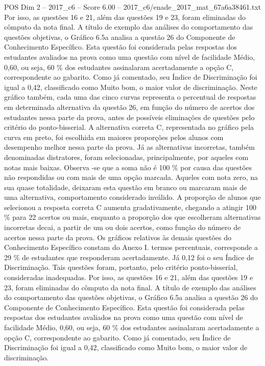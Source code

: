 \begin{textsample}{POS Dim 2 – 2017\_c6 – Score 6.00 – 2017\_c6/enade\_2017\_mat\_67a6a38461.txt}
Por isso, as questões 16 e 21, além das questões 19 e 23, foram eliminadas do cômputo da nota final.
A título de exemplo das análises do comportamento das questões objetivas, o Gráfico 6.5a analisa a questão 26 do Componente de Conhecimento Específico.
Esta questão foi considerada pelas respostas dos estudantes avaliados na prova como uma questão com nível de facilidade Médio, 0,60, ou seja, 60 \% dos estudantes assinalaram acertadamente a opção C, correspondente ao gabarito.
Como já comentado, seu Índice de Discriminação foi igual a 0,42, classificado como Muito bom, o maior valor de discriminação.
Neste gráfico também, cada uma das cinco curvas representa o percentual de respostas em determinada alternativa da questão 26, em função do número de acertos dos estudantes nessa parte da prova, antes de possíveis eliminações de questões pelo critério do ponto-bisserial.
A alternativa correta C, representada no gráfico pela curva em preto, foi escolhida em maiores proporções pelos alunos com desempenho melhor nessa parte da prova.
Já as alternativas incorretas, também denominadas distratores, foram selecionadas, principalmente, por aqueles com notas mais baixas.
Observa -se que a soma não é 100 \% por causa das questões não respondidas ou com mais de uma opção marcada.
Aqueles com nota zero, na sua quase totalidade, deixaram esta questão em branco ou marcaram mais de uma alternativa, comportamento considerado inválido.
A proporção de alunos que selecionou a resposta correta C aumenta gradativamente, chegando a atingir 100 \% para 22 acertos ou mais, enquanto a proporção dos que escolheram alternativas incorretas decai, a partir de um ou dois acertos, como função do número de acertos nessa parte da prova.
Os gráficos relativos às demais questões do Conhecimento Específico constam do Anexo I. termos percentuais, corresponde a 29 \% de estudantes que responderam acertadamente.
Já 0,12 foi o seu Índice de Discriminação.
Tais questões foram, portanto, pelo critério ponto-bisserial, consideradas inadequadas.
Por isso, as questões 16 e 21, além das questões 19 e 23, foram eliminadas do cômputo da nota final.
A título de exemplo das análises do comportamento das questões objetivas, o Gráfico 6.5a analisa a questão 26 do Componente de Conhecimento Específico.
Esta questão foi considerada pelas respostas dos estudantes avaliados na prova como uma questão com nível de facilidade Médio, 0,60, ou seja, 60 \% dos estudantes assinalaram acertadamente a opção C, correspondente ao gabarito.
Como já comentado, seu Índice de Discriminação foi igual a 0,42, classificado como Muito bom, o maior valor de discriminação.

\end{textsample}

